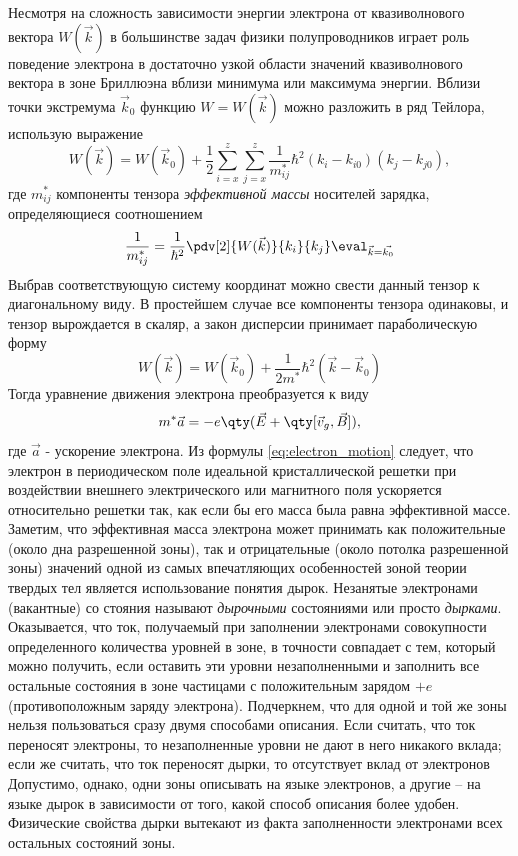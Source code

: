 Несмотря на сложность зависимости энергии электрона от квазиволнового
вектора $W(\vec k)$ в большинстве задач физики полупроводников играет роль поведение электрона в достаточно узкой области значений квазиволнового вектора в
зоне Бриллюэна вблизи минимума или максимума энергии. Вблизи точки экстремума $\vec k_0$ функцию $W = W(\vec k)$ можно разложить в ряд Тейлора, использую
выражение
\begin{equation}
	W(\vec k)= W(\vec k_0)+\frac12 \sum_{i=x}^z \sum_{j=x}^z \frac{1}{m^*_{ij} }
	\hbar^2 (k_i-k_{i0})(k_j-k_{j0}),
\end{equation}
где $m_{ij}^*$ компоненты тензора \textit{эффективной массы} носителей зарядка, определяющиеся соотношением
\begin{equation}
	\frac{1}{m^*_{ij}}=\frac{1}{\hbar^2} \pdv[2]{W(\vec k)}{k_i}{k_j}\eval_{\vec{k}=\vec{k_0}}
\end{equation}
Выбрав соответствующую систему координат можно свести данный тензор к диагональному виду. В простейшем случае все компоненты тензора одинаковы, и тензор вырождается в скаляр, а закон дисперсии принимает параболическую форму
\begin{equation}
	W(\vec{k})=W(\vec k_0) +\frac{1}{2m^*} \hbar^2 (\vec k - \vec k _0)
\end{equation}
Тогда уравнение движения электрона преобразуется к виду
\begin{equation}
 	\label{eq:electron_motion}
	m^* \vec a = -e \qty ( \vec E+ \qty[\vec v_g, \vec B] ),
\end{equation}
где $\vec a$ - ускорение электрона. Из формулы \eqref{eq:electron_motion} следует, что электрон в
периодическом поле идеальной кристаллической решетки при воздействии
внешнего электрического или магнитного поля ускоряется относительно решетки так, как если бы его масса была равна эффективной массе. Заметим, что
эффективная масса электрона может принимать как положительные (около дна
разрешенной зоны), так и отрицательные (около потолка разрешенной зоны)
значений одной из самых впечатляющих особенностей зоной теории твердых тел
является использование понятия дырок. Незанятые электронами (вакантные) со­
стояния называют \textit{дырочными} состояниями или просто \textit{дырками}. Оказывается,
что ток, получаемый при заполнении электронами совокупности определенного
количества уровней в зоне, в точности совпадает с тем, который можно получить, если оставить эти уровни незаполненными и заполнить все остальные состояния в зоне частицами с положительным зарядом $+e$ (противоположным
заряду электрона). Подчеркнем, что для одной и той же зоны нельзя пользоваться­ сразу двумя способами описания. Если считать, что ток переносят электроны, то незаполненные уровни не дают в него никакого вклада; если же считать, что ток переносят дырки, то отсутствует вклад от электронов Допустимо, однако, одни зоны описывать на языке электронов, а другие -- на языке дырок в зависимости от того, какой способ описания более удобен. Физические свойства дырки вытекают из факта заполненности электронами всех остальных состояний зоны.

